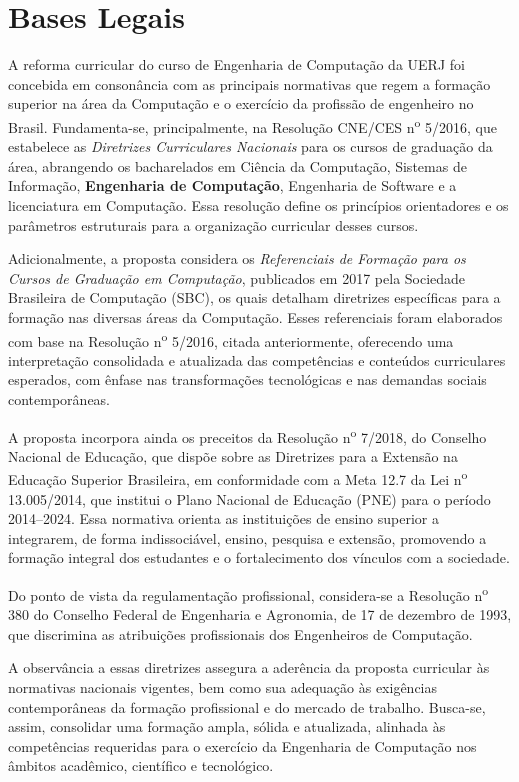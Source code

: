 \chapter{Bases Legais}

A reforma curricular do curso de Engenharia de Computação da UERJ foi concebida em consonância com as principais normativas que regem a formação superior na área da Computação e o exercício da profissão de engenheiro no Brasil. Fundamenta-se, principalmente, na Resolução CNE/CES n\textsuperscript{o} 5/2016, que estabelece as \textit{Diretrizes Curriculares Nacionais} para os cursos de graduação da área, abrangendo os bacharelados em Ciência da Computação, Sistemas de Informação, \textbf{Engenharia de Computação}, Engenharia de Software e a licenciatura em Computação. Essa resolução define os princípios orientadores e os parâmetros estruturais para a organização curricular desses cursos.

Adicionalmente, a proposta considera os \textit{Referenciais de Formação para os Cursos de Graduação em Computação}, publicados em 2017 pela Sociedade Brasileira de Computação (SBC), os quais detalham diretrizes específicas para a formação nas diversas áreas da Computação. Esses referenciais foram elaborados com base na Resolução n\textsuperscript{o} 5/2016, citada anteriormente, oferecendo uma interpretação consolidada e atualizada das competências e conteúdos curriculares esperados, com ênfase nas transformações tecnológicas e nas demandas sociais contemporâneas.

A proposta incorpora ainda os preceitos da Resolução n\textsuperscript{o} 7/2018, do Conselho Nacional de Educação, que dispõe sobre as Diretrizes para a Extensão na Educação Superior Brasileira, em conformidade com a Meta 12.7 da Lei n\textsuperscript{o} 13.005/2014, que institui o Plano Nacional de Educação (PNE) para o período 2014--2024. Essa normativa orienta as instituições de ensino superior a integrarem, de forma indissociável, ensino, pesquisa e extensão, promovendo a formação integral dos estudantes e o fortalecimento dos vínculos com a sociedade.

Do ponto de vista da regulamentação profissional, considera-se a Resolução n\textsuperscript{o} 380 do Conselho Federal de Engenharia e Agronomia, de 17 de dezembro de 1993, que discrimina as atribuições profissionais dos Engenheiros de Computação.

A observância a essas diretrizes assegura a aderência da proposta curricular às normativas nacionais vigentes, bem como sua adequação às exigências contemporâneas da formação profissional e do mercado de trabalho. Busca-se, assim, consolidar uma formação ampla, sólida e atualizada, alinhada às competências requeridas para o exercício da Engenharia de Computação nos âmbitos acadêmico, científico e tecnológico.

